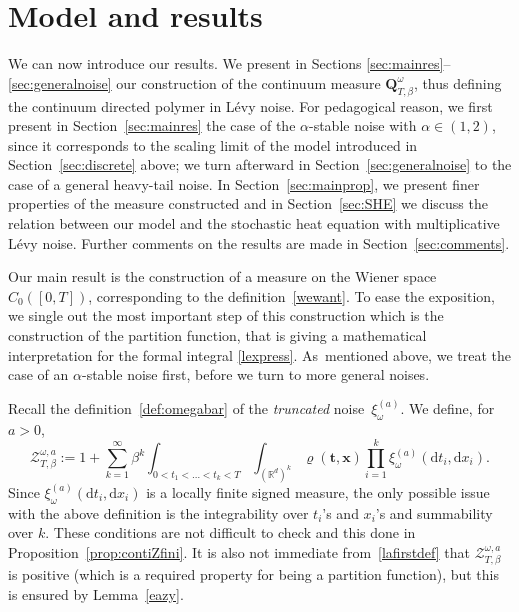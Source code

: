 \documentclass[JEP,XML,SOM,Unicode,published]{cedram}
\let\mathcal\mathscr
\theoremstyle{definition}
\newcommand{\bt}{\boldsymbol{t}}
\newcommand{\bx}{\boldsymbol{x}}
\newcommand{\dd}{\mathrm{d}}
\newcommand{\cZ}{{\ensuremath{\mathcal Z}} }
\newcommand{\bQ}{{\ensuremath{\mathbf Q}} }
\newcommand{\bbR}{{\ensuremath{\mathbb R}} }
\let\ga\alpha
\let\gb\beta
\let\go\omega
\begin{document}
\section{Model and results}

We can now introduce our results. We present in Sections \ref{sec:mainres}--\ref{sec:generalnoise} our construction of the continuum measure $\bQ_{T,\gb}^{\go}$,
thus defining the continuum directed polymer in Lévy noise.
For pedagogical reason, we first present in Section~\ref{sec:mainres} the case of the $\alpha$-stable noise with $\ga\in (1,2)$, since it corresponds
to the scaling limit of the model introduced in Section~\ref{sec:discrete} above;
we turn afterward in Section~\ref{sec:generalnoise} to the case of a general heavy-tail noise.
In Section~\ref{sec:mainprop},
we present finer properties of the
measure constructed
and
in Section~\ref{sec:SHE} we discuss the
relation between our model
and the stochastic heat equation with multiplicative Lévy noise.
Further comments on the results are
made in Section~\ref{sec:comments}.

\label{sec:mainres}

Our main result is the construction of a measure on the Wiener space $C_0([0,T])$,
corresponding to the definition~\eqref{wewant}.
To ease the exposition, we single out the most important step of this construction which is the construction of the partition function,
that is giving a mathematical interpretation for the formal integral \eqref{lexpress}.
As~mentioned above, we treat the case of an $\alpha$-stable noise first,
before we turn to more general noises.

Recall the definition~\eqref{def:omegabar}
of the \textit{truncated} noise~$\xi_{\go}^{(a)}$.
We define, for $a>0$,
\begin{equation}\label{lafirstdef}
\cZ^{\go,a}_{T,\beta}:=1+\sum_{k=1}^\infty \beta^k\int_{0<t_1<\dots<t_k<T}\int_{(\bbR^d)^k} \varrho(\bt,\bx) \prod_{i=1}^k \xi_{\go}^{(a)} (\dd t_i, \dd x_i).
\end{equation}
Since $\xi_{\go}^{(a)} (\dd t_i, \dd x_i)$ is a locally finite signed measure, the only possible issue with the above definition is the integrability over $t_i$'s and $x_i$'s and summability over $k$. These conditions are not difficult to check and this done in Proposition~\ref{prop:contiZfini}.
It is also not immediate from~\eqref{lafirstdef} that
$\cZ^{\go,a}_{T,\beta}$ is positive (which is a required property for being a partition function), but this is ensured by Lemma~\ref{eazy}.
\end{document}
